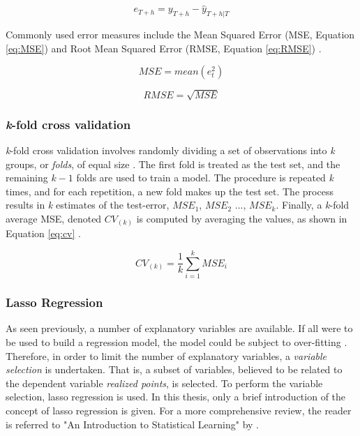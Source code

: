 \begin{equation}\label{eq:f_err}
    e_{T+h} = y_{T+h} - \hat{y}_{T+h|T}
\end{equation}

Commonly used error measures include the Mean Squared Error (MSE, Equation \ref{eq:MSE}) and Root Mean Squared Error (RMSE, Equation \ref{eq:RMSE}) \citep{Hyndman}.

\begin{equation}\label{eq:MSE}
    MSE = mean(e_t^2)
\end{equation}

\begin{equation}\label{eq:RMSE}
    RMSE = \sqrt{MSE}
\end{equation}


\subsubsection{\textit{k}-fold cross validation}
\textit{k}-fold cross validation involves randomly dividing a set of observations into \textit{k} groups, or \textit{folds}, of equal size \citep{ISLR}. The first fold is treated as the test set, and the remaining $k-1$ folds are used to train a model. The procedure is repeated \textit{k} times, and for each repetition, a new fold makes up the test set. The process results in \textit{k} estimates of the test-error, $MSE_1$, $MSE_2$ ..., $MSE_k$. Finally, a \textit{k}-fold average MSE, denoted $CV_{(k)}$ is computed by averaging the values, as shown in Equation \ref{eq:cv} \citep{ISLR}.

\begin{equation}\label{eq:cv}
    CV_{(k)} = \frac{1}{k}\sum_{i=1}^{k} MSE_i
\end{equation}

\subsubsection{Lasso Regression}

As seen previously, a number of explanatory variables are available. If all were to be used to build a regression model, the model could be subject to over-fitting \citep{ISLR}. Therefore, in order to limit the number of explanatory variables, a \textit{variable selection} is undertaken. That is, a subset of variables, believed to be related to the dependent variable \textit{realized points}, is selected. To perform the variable selection, lasso regression is used. In this thesis, only a brief introduction of the concept of lasso regression is given. For a more comprehensive review, the reader is referred to "An Introduction to Statistical Learning" by \cite{ISLR}.

